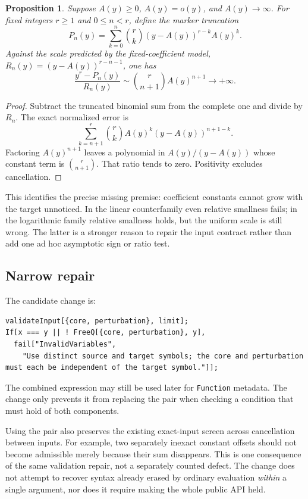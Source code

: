 \documentclass[11pt,letterpaper]{article}
\newcommand{\code}[1]{\nolinkurl{#1}}
\newtheorem{proposition}{Proposition}[section]
\begin{document}
\begin{proposition}\label{prop:sublinear}
Suppose \(A(y)\ge0\), \(A(y)=o(y)\), and \(A(y)\to\infty\). For fixed integers \(r\ge1\) and \(0\le n<r\), define the marker truncation
\[
 P_n(y)=\sum_{k=0}^{n}\binom rk (y-A(y))^{r-k}A(y)^k.
\]
Against the scale predicted by the fixed-coefficient model,
\(R_n(y)=(y-A(y))^{r-n-1}\), one has
\[
 \frac{y^r-P_n(y)}{R_n(y)}
 \sim \binom r{n+1}A(y)^{n+1}\longrightarrow+\infty.
\]
\end{proposition}
\begin{proof}
Subtract the truncated binomial sum from the complete one and divide by \(R_n\). The exact normalized error is
\[
 \sum_{k=n+1}^{r}\binom rk A(y)^k(y-A(y))^{n+1-k}.
\]
Factoring \(A(y)^{n+1}\) leaves a polynomial in \(A(y)/(y-A(y))\) whose constant term is \(\binom r{n+1}\). That ratio tends to zero. Positivity excludes cancellation.
\end{proof}

This identifies the precise missing premise: coefficient constants cannot grow with the target unnoticed. In the linear counterfamily even relative smallness fails; in the logarithmic family relative smallness holds, but the uniform scale is still wrong. The latter is a stronger reason to repair the input contract rather than add one ad hoc asymptotic sign or ratio test.

\subsection{Narrow repair}
The candidate change is:
\begin{lstlisting}
validateInput[{core, perturbation}, limit];
If[x === y || ! FreeQ[{core, perturbation}, y],
  fail["InvalidVariables",
    "Use distinct source and target symbols; the core and perturbation must each be independent of the target symbol."]];
\end{lstlisting}
The combined expression may still be used later for \code{Function} metadata. The change only prevents it from replacing the pair when checking a condition that must hold of both components.

Using the pair also preserves the existing exact-input screen across cancellation between inputs. For example, two separately inexact constant offsets should not become admissible merely because their sum disappears. This is one consequence of the same validation repair, not a separately counted defect. The change does not attempt to recover syntax already erased by ordinary evaluation \emph{within} a single argument, nor does it require making the whole public API held.
\end{document}
